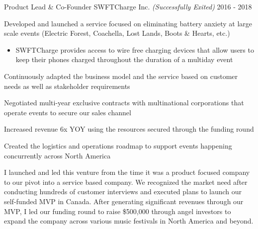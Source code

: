 \begin{cventries}
  \cventry
    {Product Lead \& Co-Founder} %
    {SWFTCharge Inc.
   \textit{\textcolor{awesome}{(Successfully Exited)}}
    } %
    {} %
    {2016 - 2018} %
    {
    \begin{cvitems} %
        \item {Developed and launched a service focused on eliminating battery anxiety at large scale events (Electric Forest, Coachella, Lost Lands, Boots \& Hearts, etc.)
        \begin{itemize}[leftmargin=*]
            \item {SWFTCharge provides access to wire free charging devices that allow users to keep their phones charged throughout the duration of a multiday event}
        \end{itemize}
        \item {Continuously adapted the business model and the service based on customer needs as well as stakeholder requirements}
        \item {Negotiated multi-year exclusive contracts with multinational corporations that operate events to secure our sales channel}
        \item {Increased revenue 6x YOY using the resources secured through the funding round}
        \item {Created the logistics and operations roadmap to support events happening concurrently across North America}}
    \end{cvitems}
    }
    {
    \begin{cventrysummary}
        I launched and led this venture from the time it was a product focused company to our pivot into a service based company. We recognized the market need after conducting hundreds of customer interviews and executed plans to launch our self-funded MVP in Canada. After generating significant revenues through our MVP, I led our funding round to raise \$500,000 through angel investors to expand the company across various music festivals in North America and beyond.
    \end{cventrysummary} 
    }
\end{cventries}
